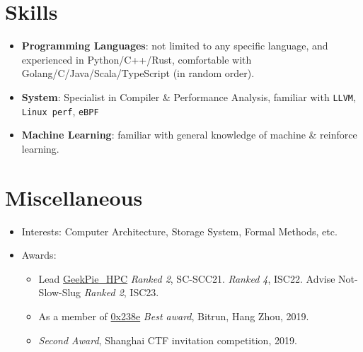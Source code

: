\documentclass{resume}
\newcommand{\en}[1]{#1}
\newcommand{\zh}[1]{}
\begin{document}
\section{\en{Skills}\zh{技能}}
\begin{itemize}[parsep=0.25ex]
      \item \en{\textbf{Programming Languages}:
                  not limited to any specific language,
                  and experienced in Python/C++/Rust,
                  comfortable with Golang/C/Java/Scala/TypeScript (in random order).}
            \zh{\textbf{编程语言}:
                  不局限于特定编程语言，且尤其熟悉 Python/C++/Rust 等，
                  了解 Golang/C/Java/Scala/TypeScript 等。}

      \item \en{\textbf{System}:
                  Specialist in Compiler \& Performance Analysis, familiar with \texttt{LLVM}, \texttt{Linux perf}, \texttt{eBPF}}
            \zh{\textbf{系统}:
                  熟悉各种编译器及操作系统内核的概念与设计，熟悉各种内核性能调优工具，例如\texttt{LLVM}, \texttt{Linux perf}, \texttt{eBPF}。}

      \item \en{\textbf{Machine Learning}:
                  familiar with general knowledge of machine \& reinforce learning.}
            \zh{\textbf{机器学习}:
                  熟悉经典机器与强化学习算法。}
\end{itemize}

\section{\en{Miscellaneous}\zh{其他}}
\begin{itemize}
      \item \en{Interests: Computer Architecture, Storage System, Formal Methods, etc.}
            \zh{兴趣：高性能计算、体系结构、存储、形式化验证安全等。}
      \item \en{Awards:}
      \zh{所获奖项：}
      \begin{itemize}
      \item \en{Lead \href{https://hpc.geekpie.club}{GeekPie\_HPC} \textit{Ranked 2}, SC-SCC21. \textit{Ranked 4}, ISC22. Advise Not-Slow-Slug \textit{Ranked 2}, ISC23.}
            \zh{带领\href{https://hpc.geekpie.club}{GeekPie\_HPC} SCC21 团队第2名，ISC22 团队第4名，指导 Not-Slow-Slug 团队 ISC23 团队第2名。}
      \item \en{As a member of \href{https://github.com/0x238e/Vchain}{0x238e} \textit{Best award}, Bitrun, Hang Zhou, 2019.}
            \zh{带领\href{https://github.com/0x238e/Vchain}{0x238e} Bitrun Hackathon 比赛最佳奖}
      \item \en{\textit{Second Award}, Shanghai CTF invitation competition, 2019.}
            \zh{上海2019年 CTF 邀请赛比赛二等奖}
      \end{itemize}
\end{itemize}
\end{document}
